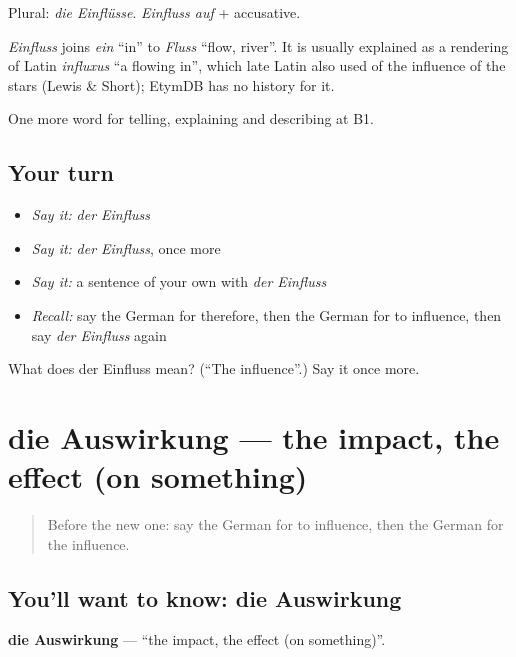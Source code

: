 Plural: \emph{die Einflüsse}. \emph{Einfluss auf} + accusative.

\begin{cousinweb}
\emph{Einfluss} joins \emph{ein} \textquotedblleft{}in\textquotedblright{} to \emph{Fluss} \textquotedblleft{}flow, river\textquotedblright{}. It is usually explained as a rendering of Latin \emph{influxus} \textquotedblleft{}a flowing in\textquotedblright{}, which late Latin also used of the influence of the stars (Lewis \& Short); EtymDB has no history for it.
\end{cousinweb}

\begin{grammarlens}[title={What you've built}]
One more word for telling, explaining and describing at B1.
\end{grammarlens}

\subsection*{Your turn}
\begin{itemize}
\raggedright
  \item \emph{Say it:} \emph{der Einfluss}
  \item \emph{Say it:} \emph{der Einfluss}, once more
  \item \emph{Say it:} a sentence of your own with \emph{der Einfluss}
  \item \emph{Recall:} say the German for therefore, then the German for to influence, then say \emph{der Einfluss} again
\end{itemize}

\begin{tcolorbox}[breakable,colback=teal!4,colframe=teal!35!black,title={Before you move on}]
What does der Einfluss mean? (\textquotedblleft{}The influence\textquotedblright{}.) Say it once more.
\end{tcolorbox}
\section[die Auswirkung]{die Auswirkung — the impact, the effect (on something)}

\label{lesson:GE-C344-auswirkung}



\begin{quote}
Before the new one: say the German for to influence, then the German for the influence.
\end{quote}

\subsection*{You'll want to know: die Auswirkung}
\textbf{die Auswirkung} — \textquotedblleft{}the impact, the effect (on something)\textquotedblright{}.

